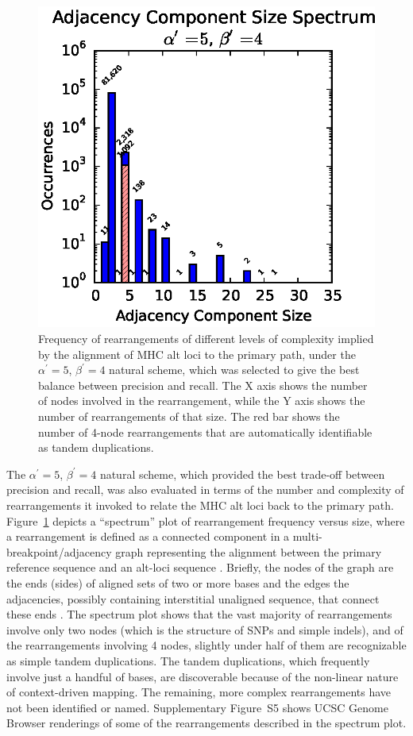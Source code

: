 \begin{figure}[t]
	\centering
    \includegraphics[width=0.5\columnwidth]{figures/02_contextschemes/mhcRearrangements.eps}
  \caption[MHC alignment rearrangements]{Frequency of rearrangements of different levels of complexity implied by the alignment of MHC alt loci to the primary path, under the $\alpha^\prime = 5$, $\beta^\prime = 4$ natural scheme, which was selected to give the best balance between precision and recall. The X axis shows the number of nodes involved in the rearrangement, while the Y axis shows the number of rearrangements of that size. The red bar shows the number of 4-node rearrangements that are automatically identifiable as tandem duplications.}
  \label{fig:rearrangements}
\end{figure}


The $\alpha^\prime = 5$, $\beta^\prime = 4$ natural scheme, which provided the best trade-off between precision and recall, was also evaluated in terms of the number and complexity of rearrangements it invoked to relate the MHC alt loci back to the primary path. Figure~\ref{fig:rearrangements} depicts a ``spectrum'' plot of rearrangement frequency versus size, where a rearrangement is defined as a connected component in a multi-breakpoint/adjacency %
graph representing the alignment between the primary reference sequence and an alt-loci sequence \citep{medvedev2007computability,paten2011cactus}. Briefly, the nodes of the graph are the ends (sides) of aligned sets of two or more bases and the edges the adjacencies, possibly containing interstitial unaligned sequence, that connect these ends \citep{medvedev2007computability,paten2011cactus}. The spectrum plot shows that the vast majority of rearrangements involve only two nodes (which is the structure of SNPs and simple indels), and of the rearrangements involving 4 nodes, slightly under half of them are recognizable as simple tandem duplications. The tandem duplications, which frequently involve just a handful of bases, are discoverable because of the non-linear nature of context-driven mapping. The remaining, more complex rearrangements have not been identified or named. Supplementary Figure~S5 shows UCSC Genome Browser renderings of some of the rearrangements described in the spectrum plot. 

